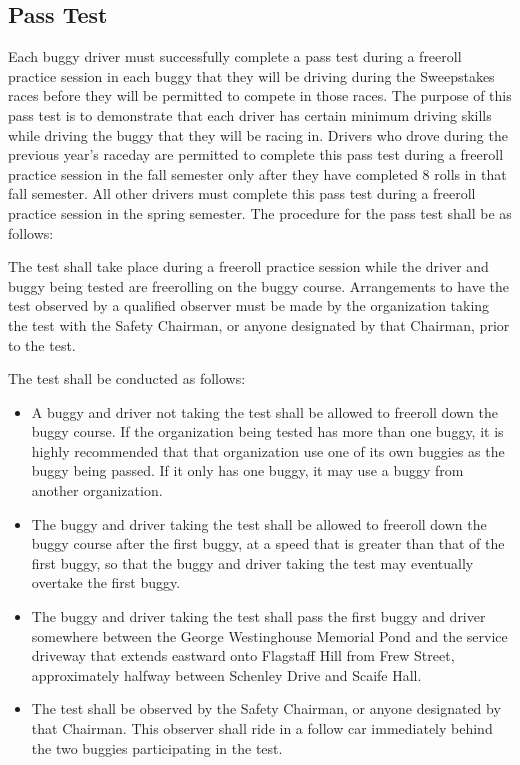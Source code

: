 \subsection{Pass Test}

	Each buggy driver must successfully complete a pass test during a freeroll practice session in each buggy that they will be driving during the Sweepstakes races before they will be permitted to compete in those races. The purpose of this pass test is to demonstrate that each driver has certain minimum driving skills while driving the buggy that they will be racing in. Drivers who drove during the previous year’s raceday are permitted to complete this pass test during a freeroll practice session in the fall semester only after they have completed 8 rolls in that fall semester. All other drivers must complete this pass test during a freeroll practice session in the spring semester. The procedure for the pass test shall be as follows:
	
	The test shall take place during a freeroll practice session while the driver and buggy being tested are freerolling on the buggy course. Arrangements to have the test observed by a qualified observer must be made by the organization taking the test with the Safety Chairman, or anyone designated by that Chairman, prior to the test.
	
	The test shall be conducted as follows:

	\begin{itemize}

		\item A buggy and driver not taking the test shall be allowed to freeroll down the buggy course. If the organization being tested has more than one buggy, it is highly recommended that that organization  use one of its own buggies as the buggy being passed. If it only has one buggy, it may use a buggy from another organization.

		\item The buggy and driver taking the test shall be allowed to freeroll down the buggy course after the first buggy, at a speed that is greater than that of the first buggy, so that the buggy and driver taking the test may eventually overtake the first buggy.

		\item The buggy and driver taking the test shall pass the first buggy and driver somewhere between the George Westinghouse Memorial Pond and the service driveway that extends eastward onto Flagstaff Hill from Frew Street, approximately halfway between Schenley Drive and Scaife Hall.

		\item The test shall be observed by the Safety Chairman, or anyone designated by that Chairman. This observer shall ride in a follow car immediately behind the two buggies participating in the test.

	\end{itemize}


